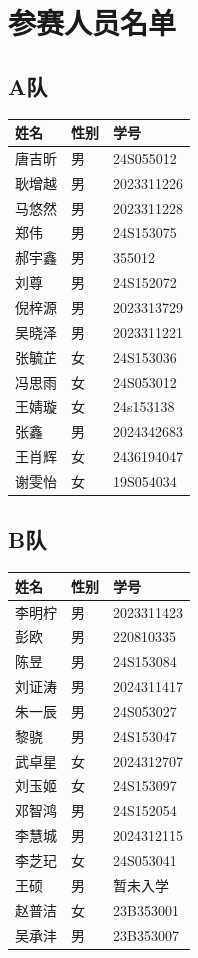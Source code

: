 \documentclass{ctexart}
\begin{document}
\appendix
\section{参赛人员名单}

\subsection*{A队}
\renewcommand{\arraystretch}{1.2}
\begin{tabularx}{\textwidth}{@{} L{3cm} M{2cm} X @{}}
    \toprule
    \textbf{姓名} & \textbf{性别} & \textbf{学号} \\
    \midrule
    唐吉昕 & 男 & 24S055012 \\
    耿增越 & 男 & 2023311226 \\
    马悠然 & 男 & 2023311228 \\
    郑伟 & 男 & 24S153075 \\
    郝宇鑫 & 男 & 355012 \\
    刘尊 & 男 & 24S152072 \\
    倪梓源 & 男 & 2023313729 \\
    吴晓泽 & 男 & 2023311221 \\
    张毓芷 & 女 & 24S153036 \\
    冯思雨 & 女 & 24S053012 \\
    王婧璇 & 女 & 24s153138 \\
    张鑫 & 男 & 2024342683 \\
    王肖辉 & 女 & 2436194047 \\
    谢雯怡 & 女 & 19S054034 \\
    \bottomrule
\end{tabularx}

\subsection*{B队}
\renewcommand{\arraystretch}{1.2}
\begin{tabularx}{\textwidth}{@{} L{3cm} M{2cm} X @{}}
    \toprule
    \textbf{姓名} & \textbf{性别} & \textbf{学号} \\
    \midrule
    李明柠 & 男 & 2023311423 \\
    彭欧 & 男 & 220810335 \\
    陈昱 & 男 & 24S153084 \\
    刘证涛 & 男 & 2024311417 \\
    朱一辰 & 男 & 24S053027 \\
    黎骁 & 男 & 24S153047 \\
    武卓星 & 女 & 2024312707 \\
    刘玉姬 & 女 & 24S153097 \\
    邓智鸿 & 男 & 24S152054 \\
    李慧城 & 男 & 2024312115 \\
    李芝玘 & 女 & 24S053041 \\
    王硕 & 男 & 暂未入学 \\
    赵普洁 & 女 & 23B353001 \\
    吴承沣 & 男 & 23B353007 \\
    \bottomrule
\end{tabularx}
\renewcommand{\arraystretch}{1.0}
\end{document}
